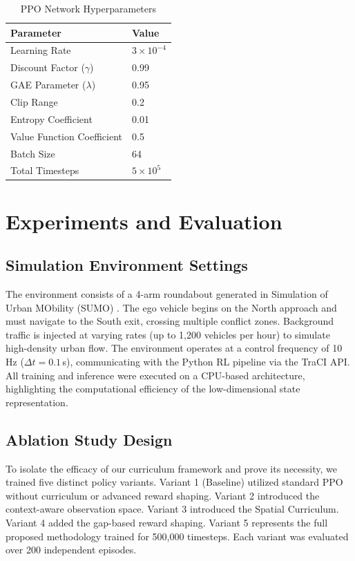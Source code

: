 \documentclass[conference]{IEEEtran}
\begin{document}
\begin{table}[htbp]
\centering
\caption{PPO Network Hyperparameters}
\label{tab:hyperparams}
\begin{tabular}{@{}ll@{}}
\toprule
\textbf{Parameter} & \textbf{Value} \\ \midrule
Learning Rate & $3 \times 10^{-4}$ \\
Discount Factor ($\gamma$) & 0.99 \\
GAE Parameter ($\lambda$) & 0.95 \\
Clip Range & 0.2 \\
Entropy Coefficient & 0.01 \\
Value Function Coefficient & 0.5 \\
Batch Size & 64 \\
Total Timesteps & $5 \times 10^5$ \\ \bottomrule
\end{tabular}
\end{table}

\section{Experiments and Evaluation}
\subsection{Simulation Environment Settings}
The environment consists of a 4-arm roundabout generated in Simulation of Urban MObility (SUMO) \cite{krajzewicz2012recent}. The ego vehicle begins on the North approach and must navigate to the South exit, crossing multiple conflict zones. Background traffic is injected at varying rates (up to 1,200 vehicles per hour) to simulate high-density urban flow. The environment operates at a control frequency of 10 Hz ($\Delta t = 0.1$\,s), communicating with the Python RL pipeline via the TraCI API. All training and inference were executed on a CPU-based architecture, highlighting the computational efficiency of the low-dimensional state representation. 

\subsection{Ablation Study Design}
To isolate the efficacy of our curriculum framework and prove its necessity, we trained five distinct policy variants. Variant 1 (Baseline) utilized standard PPO without curriculum or advanced reward shaping. Variant 2 introduced the context-aware observation space. Variant 3 introduced the Spatial Curriculum. Variant 4 added the gap-based reward shaping. Variant 5 represents the full proposed methodology trained for 500,000 timesteps. Each variant was evaluated over 200 independent episodes.
\end{document}
